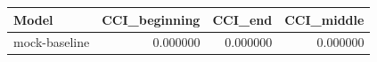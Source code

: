 \begin{tabular}{lrrr}
\toprule
Model & CCI_beginning & CCI_end & CCI_middle \\
\midrule
mock-baseline & 0.000000 & 0.000000 & 0.000000 \\
\bottomrule
\end{tabular}
